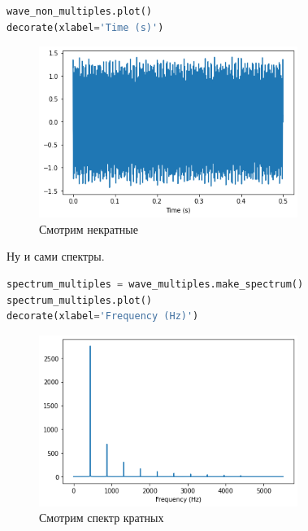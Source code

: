 \documentclass[a4paper,12pt]{report}
\begin{document}
\begin{lstlisting}[language=Python,caption=Смотрим некратные]
wave_non_multiples.plot()
decorate(xlabel='Time (s)')
\end{lstlisting}

    \begin{figure}[H]
        \centering
        \includegraphics[width=0.75\textwidth]{ex3_visualizing_non_multiples.png}
        \caption{Смотрим некратные}
        \label{fig:ex3_visualizing_non_multiples}
    \end{figure}
    
    Ну и сами спектры.
    
\begin{lstlisting}[language=Python,caption=Смотрим спектр кратных]
spectrum_multiples = wave_multiples.make_spectrum()
spectrum_multiples.plot()
decorate(xlabel='Frequency (Hz)')
\end{lstlisting}

    \begin{figure}[H]
        \centering
        \includegraphics[width=0.75\textwidth]{ex3_spectrum_of_multiples_series.png}
        \caption{Смотрим спектр кратных}
        \label{fig:ex3_spectrum_of_multiples_series}
    \end{figure}
    
\end{document}
